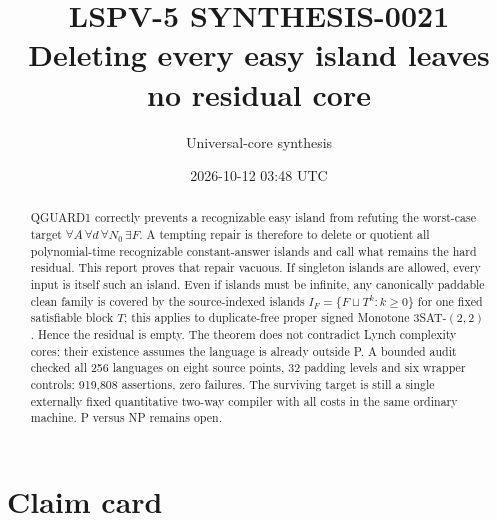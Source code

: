 \documentclass[11pt]{article}
\title{LSPV-5 SYNTHESIS-0021\\
Deleting every easy island leaves no residual core}
\author{Universal-core synthesis}
\date{2026-10-12 03:48 UTC}
\begin{document}
\maketitle

\begin{center}
\end{center}

\begin{abstract}
QGUARD1 correctly prevents a recognizable easy island from refuting the
worst-case target $\forall A\,\forall d\,\forall N_0\,\exists F$.  A tempting
repair is therefore to delete or quotient all polynomial-time recognizable
constant-answer islands and call what remains the hard residual.  This report
proves that repair vacuous.  If singleton islands are allowed, every input is
itself such an island.  Even if islands must be infinite, any canonically
paddable clean family is covered by the source-indexed islands
$I_F=\{F\sqcup T^k:k\ge0\}$ for one fixed satisfiable block $T$; this applies
to duplicate-free proper signed Monotone $3$SAT-$(2,2)$.  Hence the residual is
empty.  The theorem does not contradict Lynch complexity cores: their
existence assumes the language is already outside P.  A bounded audit checked
all 256 languages on eight source points, 32 padding levels and six wrapper
controls: 919,808 assertions, zero failures.  The surviving target is still a
single externally fixed quantitative two-way compiler with all costs in the
same ordinary machine.  P versus NP remains open.
\end{abstract}

\section{Claim card}
\end{document}
